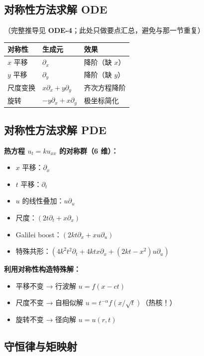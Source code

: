 \subsection{对称性方法求解 ODE}

（完整推导见 \textbf{ODE-4}；此处只做要点汇总，避免与那一节重复）

\begin{center}
\begin{tabular}{L{4cm}L{4cm}L{4cm}}
\toprule
\textbf{对称性} & \textbf{生成元} & \textbf{效果} \\
\midrule
$x$ 平移 & $\partial_x$ & 降阶（缺 $x$） \\
$y$ 平移 & $\partial_y$ & 降阶（缺 $y$） \\
尺度变换 & $x\partial_x + y\partial_y$ & 齐次方程降阶 \\
旋转 & $-y\partial_x + x\partial_y$ & 极坐标简化 \\
\bottomrule
\end{tabular}
\end{center}

\subsection{对称性方法求解 PDE}

\textbf{热方程 $u_t = ku_{xx}$ 的对称群（6 维）：}
\begin{itemize}
  \item $x$ 平移：$\partial_x$
  \item $t$ 平移：$\partial_t$
  \item $u$ 的线性叠加：$u\partial_u$
  \item 尺度：$(2t\partial_t + x\partial_x)$
  \item Galilei boost：$(2kt\partial_x + xu\partial_u)$
  \item 特殊共形：$(4k^2t^2\partial_t + 4ktx\partial_x + (2kt - x^2)u\partial_u)$
\end{itemize}

\textbf{利用对称性构造特殊解：}
\begin{itemize}
  \item 平移不变 → 行波解 $u = f(x - ct)$
  \item 尺度不变 → 自相似解 $u = t^{-\alpha}f(x/\sqrt{t})$（热核！）
  \item 旋转不变 → 径向解 $u = u(r, t)$
\end{itemize}

\subsection{守恒律与矩映射}

